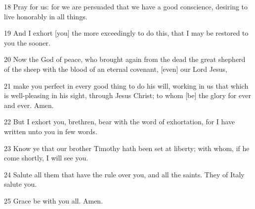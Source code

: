 \par 18 Pray for us: for we are persuaded that we have a good conscience, desiring to live honorably in all things.
\par 19 And I exhort [you] the more exceedingly to do this, that I may be restored to you the sooner.
\par 20 Now the God of peace, who brought again from the dead the great shepherd of the sheep with the blood of an eternal covenant, [even] our Lord Jesus,
\par 21 make you perfect in every good thing to do his will, working in us that which is well-pleasing in his sight, through Jesus Christ; to whom [be] the glory for ever and ever. Amen.
\par 22 But I exhort you, brethren, bear with the word of exhortation, for I have written unto you in few words.
\par 23 Know ye that our brother Timothy hath been set at liberty; with whom, if he come shortly, I will see you.
\par 24 Salute all them that have the rule over you, and all the saints. They of Italy salute you.
\par 25 Grace be with you all. Amen.


